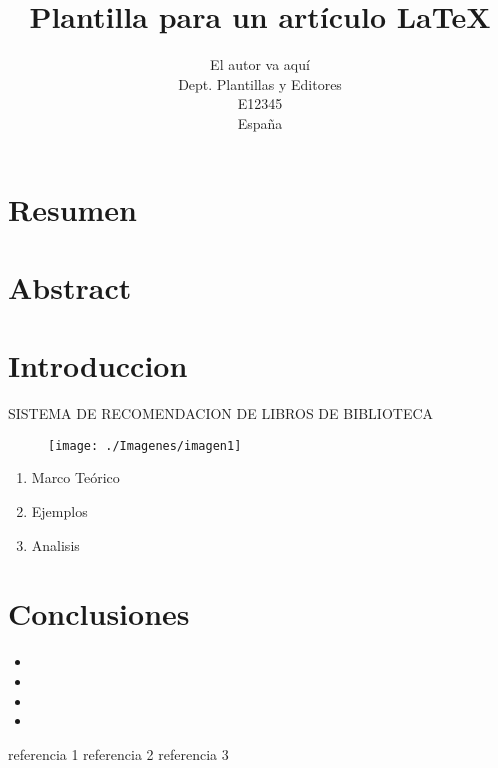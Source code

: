 %
%



\title{Plantilla para un artículo \LaTeX}
\author{El autor va aquí\\
  \small Dept. Plantillas y Editores\\
  \small E12345\\
  \small España
}


\section{Resumen}


\section{Abstract}


\newpage

\section{Introduccion}
\item


\newpage
\begin{center}
    SISTEMA DE RECOMENDACION DE LIBROS DE BIBLIOTECA
\end{center}
\begin{figure}[htb]
\begin{center}
\texttt{[image: ./Imagenes/imagen1]}
\end{center}
\end{figure}
\begin{enumerate}
    \item Marco Teórico\\
    
    \item Ejemplos\\
    
    \item Analisis\\
    
    
\end{enumerate}


\newpage

\section{Conclusiones}

\begin{itemize}
\item 

\item 


\item 

\item 
\end{itemize}


\newpage
\begin{thebibliography}{99}


 referencia 1
  referencia 2
  referencia 3

\end{thebibliography}


